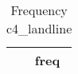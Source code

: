 \begin{table}[htbp]\centering
\def\sym#1{\ifmmode^{#1}\else\(^{#1}\)\fi}
\caption{Frequency c4\_landline \label{tab:"label"}}
\begin{tabular*}{0.9\hsize}{@{\hskip\tabcolsep\extracolsep\fill}l*{1}{c}}
\toprule
                                &     freq\\
\midrule
\bottomrule
\end{tabular*}
\end{table}
